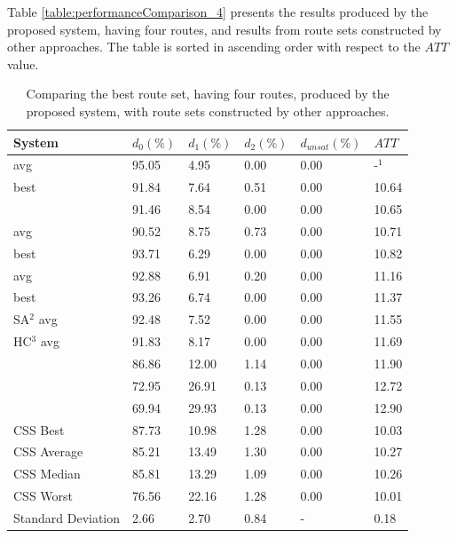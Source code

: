 Table \vref{table:performanceComparison_4} presents the results produced by the proposed system, having four routes, and results from route sets constructed by other approaches. The table is sorted in ascending order with respect to the $ATT$ value.

\begin{table}[H]
	\centering
    \hspace*{-1.0cm}
    \begin{tabular}{|l||l|l|l|l|l|}
 	\hline
 	\textbf{System} & $d_0(\%)$ & $d_1(\%)$ & $d_2(\%)$ & $d_{unsat}(\%)$ & $ATT$ \\
 	\hline
    \citet{nikolic14} avg & 95.05 & 4.95 & 0.00 & 0.00 & -$^1$ \\
    \citet{kechagiopoulos14} best & 91.84 & 7.64 & 0.51 & 0.00 & 10.64 \\
    \citet{zhang10} & 91.46 & 8.54 & 0.00 & 0.00 & 10.65 \\
    \citet{kechagiopoulos14} avg & 90.52 & 8.75 & 0.73 & 0.00 & 10.71 \\
    \citet{chew12} best & 93.71 & 6.29 & 0.00 & 0.00 & 10.82 \\
    \citet{chew12} avg & 92.88 & 6.91 & 0.20 & 0.00 & 11.16 \\
    \citet{fan10} best & 93.26 & 6.74 & 0.00 & 0.00 & 11.37 \\
    \citet{fan10} SA$^2$ avg & 92.48 & 7.52 & 0.00 & 0.00 & 11.55 \\
    \citet{fan10} HC$^3$ avg & 91.83 & 8.17 & 0.00 & 0.00 & 11.69 \\
    \citet{chakroborty02} & 86.86 & 12.00 & 1.14 & 0.00 & 11.90 \\
    \citet{kidwai98} & 72.95 & 26.91 & 0.13 & 0.00 & 12.72 \\
    \citet{mandl79} & 69.94 & 29.93 & 0.13 & 0.00 & 12.90 \\
    \hline
    CSS Best & 87.73 & 10.98 & 1.28 & 0.00 & 10.03\\
    CSS Average & 85.21 & 13.49 & 1.30 & 0.00 & 10.27\\
    CSS Median & 85.81 & 13.29 & 1.09 & 0.00 & 10.26\\
    CSS Worst & 76.56 & 22.16 & 1.28 & 0.00 & 10.01\\
    Standard Deviation & 2.66 & 2.70 & 0.84 & - & 0.18\\
    \hline
    \end{tabular}
    \caption {Comparing the best route set, having four routes, produced by the proposed system, with route sets constructed by other approaches.}

\end{table}
